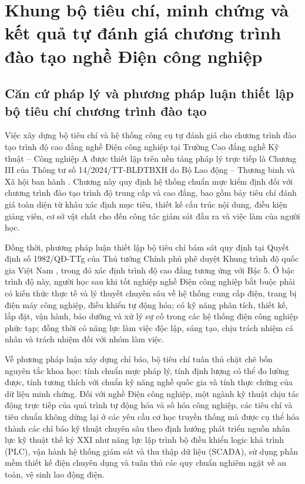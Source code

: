 \section{Khung bộ tiêu chí, minh chứng và kết quả tự đánh giá chương trình đào tạo nghề Điện công nghiệp}

\subsection{Căn cứ pháp lý và phương pháp luận thiết lập bộ tiêu chí chương trình đào tạo}

Việc xây dựng bộ tiêu chí và hệ thống công cụ tự đánh giá cho chương trình đào tạo trình độ cao đẳng nghề Điện công nghiệp tại Trường Cao đẳng nghề Kỹ thuật -- Công nghiệp A được thiết lập trên nền tảng pháp lý trực tiếp là Chương III của Thông tư số 14/2024/TT-BLĐTBXH do Bộ Lao động -- Thương binh và Xã hội ban hành \parencite{bldtbxh2024}. Chương này quy định hệ thống chuẩn mực kiểm định đối với chương trình đào tạo trình độ trung cấp và cao đẳng, bao gồm bảy tiêu chí đánh giá toàn diện từ khâu xác định mục tiêu, thiết kế cấu trúc nội dung, điều kiện giảng viên, cơ sở vật chất cho đến công tác giám sát đầu ra và việc làm của người học.

Đồng thời, phương pháp luận thiết lập bộ tiêu chí bám sát quy định tại Quyết định số 1982/QĐ-TTg của Thủ tướng Chính phủ phê duyệt Khung trình độ quốc gia Việt Nam \parencite{qd1982}, trong đó xác định trình độ cao đẳng tương ứng với Bậc 5. Ở bậc trình độ này, người học sau khi tốt nghiệp nghề Điện công nghiệp bắt buộc phải có kiến thức thực tế và lý thuyết chuyên sâu về hệ thống cung cấp điện, trang bị điện máy công nghiệp, điều khiển tự động hóa; có kỹ năng phân tích, thiết kế, lắp đặt, vận hành, bảo dưỡng và xử lý sự cố trong các hệ thống điện công nghiệp phức tạp; đồng thời có năng lực làm việc độc lập, sáng tạo, chịu trách nhiệm cá nhân và trách nhiệm đối với nhóm làm việc.

Về phương pháp luận xây dựng chỉ báo, bộ tiêu chí tuân thủ chặt chẽ bốn nguyên tắc khoa học: tính chuẩn mực pháp lý, tính định lượng có thể đo lường được, tính tương thích với chuẩn kỹ năng nghề quốc gia và tính thực chứng của dữ liệu minh chứng. Đối với nghề Điện công nghiệp, một ngành kỹ thuật chịu tác động trực tiếp của quá trình tự động hóa và số hóa công nghiệp, các tiêu chí và tiêu chuẩn không dừng lại ở các yêu cầu cơ học truyền thống mà được cụ thể hóa thành các chỉ báo kỹ thuật chuyên sâu theo định hướng phát triển nguồn nhân lực kỹ thuật thế kỷ XXI \parencite{trankhanhduc2010} như năng lực lập trình bộ điều khiển logic khả trình (PLC), vận hành hệ thống giám sát và thu thập dữ liệu (SCADA), sử dụng phần mềm thiết kế điện chuyên dụng và tuân thủ các quy chuẩn nghiêm ngặt về an toàn, vệ sinh lao động điện.

